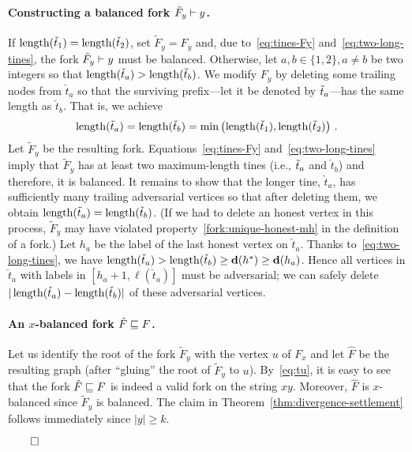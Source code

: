     \paragraph{Constructing a balanced fork $\tilde{F}_y \vdash y$.}    
    If $\operatorname{length}(\check{t}_1) = \operatorname{length}(\check{t}_2)$, set $\tilde{F}_y = F_y$ 
    and, due to~\eqref{eq:tines-Fy} and~\eqref{eq:two-long-tines}, 
    the fork $\tilde{F}_y \vdash y$ must be balanced. 
    Otherwise, 
    let $a, b \in \{1, 2\}, a \neq b$ be two integers so that 
    $\operatorname{length}(\check{t}_a) > \operatorname{length}(\check{t}_b)$. 
    We modify $F_y$ by deleting some trailing nodes from $\check{t}_a$ 
    so that the surviving prefix---let it be denoted by $\tilde{t}_a$---has the same length as $\check{t}_b$. 
    That is, we achieve 
    \[
      \operatorname{length}(\tilde{t}_a) = \operatorname{length}(\check{t}_b) = \min\left(\operatorname{length}(\check{t}_1), \operatorname{length}(\check{t}_2) \right)
      \,. 
    \]
    Let $\tilde{F}_y$ be the resulting fork. 
    Equations~\eqref{eq:tines-Fy} and~\eqref{eq:two-long-tines} imply that 
    $\tilde{F}_y$ has at least two maximum-length tines (i.e., $\tilde{t}_a$ and $\check{t}_b$) 
    and therefore, it is balanced.
    It remains to show that the longer tine, $\check{t}_a$, 
    has sufficiently many trailing adversarial vertices so that after deleting them, 
    we obtain 
    $\operatorname{length}(\tilde{t}_a) = \operatorname{length}(\check{t}_b)$. 
    (If we had to delete an honest vertex in this process, 
    $\tilde{F}_y$ may have violated 
    property~\ref{fork:unique-honest-mh} in the definition of a fork.)    
    Let $h_a$ be the label of the last honest vertex 
    on $\check{t}_a$. 
    Thanks to~\eqref{eq:two-long-tines}, 
    we have 
    $\operatorname{length}(\check{t}_a) > \operatorname{length}(\check{t}_b) \geq \mathbf{d}(h^*) \geq \mathbf{d}(h_a)$. 
    Hence all vertices in $\check{t}_a$ 
    with labels in $[h_a + 1, \ell(\check{t}_a)]$ 
    must be adversarial; 
    we can safely delete $|\operatorname{length}(\check{t}_a) - \operatorname{length}(\check{t}_b)|$ 
    of these adversarial vertices.

    
    \paragraph{An $x$-balanced fork $\hat{F} \sqsubseteq F$.} 
    Let us identify the root of the fork $\tilde{F}_y$ with the vertex $u$ of $F_x$ and 
    let $\hat{F}$ be the resulting graph (after ``gluing'' the root of $\tilde{F}_y$ to $u$). 
    By~\eqref{eq:tu}, it is easy to see that the fork 
    $\hat{F} \sqsubseteq F$ 
    is indeed a valid fork on the string $x y$. 
    Moreover, $\hat{F}$ is $x$-balanced since $\tilde{F}_y$ is balanced. 
    The claim in Theorem~\ref{thm:divergence-settlement} follows immediately since $|y| \geq k$.
  
    \hfill$\qed$


